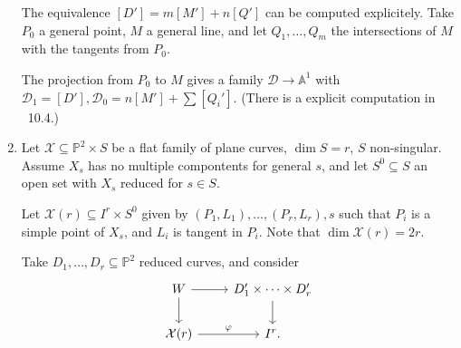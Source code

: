 \documentclass[leqno, openany]{memoir}
\theoremstyle{definition}
\theoremstyle{remark}
\theoremstyle{plain}
\theoremstyle{definition}
\theoremstyle{remark}
\renewcommand{\P}{\mathbb{P}}
\newcommand{\mc}[1]{\mathcal{#1}}
\begin{document}
\begin{enumerate}
The equivalence $[D']=m[M']+n[Q']$ can be computed explicitely. Take $P_0$ a
general point, $M$ a general line, and let $Q_1, \dots, Q_m$ the intersections
of $M$ with the tangents from $P_0$.  \begin{figure}[H] \centering
        \end{figure}

The projection from $P_0$ to $M$ gives a family $\mathcal{D} \to \mathbb{A}^1$
with $\mathcal{D}_1=[D'], \mathcal{D}_0 = n[M']+\sum [Q_i']$. (There is a
explicit computation in \textsection~10.4.) \item Let $\mathcal{X} \subseteq
\P^2 \times S$ be a flat family of plane curves, $\dim S=r$, $S$ non-singular.
Assume $X_s$ has no multiple compontents for general $s$, and let $S^0
\subseteq S$ an open set with $X_s$ reduced for $s \in S$. 

Let $\mc{X}(r)\subseteq I^r \times S^0$ given by $(P_1, L_1), \dots, (P_r,
L_r), s$ such that $P_i$ is a simple point of $X_s$, and $L_i$ is tangent in
$P_i$. Note that $\dim \mc{X}(r)=2r$.

Take $D_1, \dots, D_r \subseteq \P^2$ reduced curves, and consider \[
    \begin{tikzcd} W \arrow[r] \arrow[d] & D_1' \times \cdots \times D_r'
    \arrow[d] \\ \mc{X}(r) \arrow[r, "\varphi"] & I^r. \end{tikzcd} \]


\end{enumerate}
\end{document}
